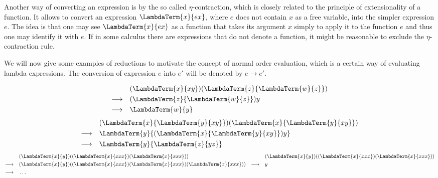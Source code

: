 Another way of converting an expression is by the so called $\eta$-contraction,
which is closely related to the principle of extensionality of a function. It
allows to convert an expression $\LambdaTerm{x}{ex}$, where $e$ does not contain
$x$ as a free variable, into the simpler expression $e$. The idea is that one
may see $\LambdaTerm{x}{ex}$ as a function that takes its argument $x$ simply to
apply it to the function $e$ and thus one may identify it with $e$. If in some
calculus there are expressions that do not denote a function, it might be
reasonable to exclude the $\eta$-contraction rule.

We will now give some examples of reductions to motivate the concept of normal
order evaluation, which is a certain way of evaluating lambda
expressions. The conversion of expression $e$ into $e'$ will be denoted by $e \longrightarrow
e'$. 
\begin{expl}
\begin{align}
  & (\LambdaTerm{x}{xy})(\LambdaTerm{z}{\LambdaTerm{w}{z}}) \\
\longrightarrow \quad& (\LambdaTerm{z}{\LambdaTerm{w}{z}})y \notag \\
\longrightarrow \quad& \LambdaTerm{w}{y} \notag
\end{align}
\begin{align}
& (\LambdaTerm{x}{\LambdaTerm{y}{xy}})(\LambdaTerm{x}{\LambdaTerm{y}{xy}})\\
\longrightarrow \quad& \LambdaTerm{y}{(\LambdaTerm{x}{\LambdaTerm{y}{xy}})y} \notag\\
\longrightarrow \quad& \LambdaTerm{y}{\LambdaTerm{z}{yz}} \notag
\end{align}
\begin{align}
\label{eq:lambda-diverge}
  &  (\LambdaTerm{x}{y})((\LambdaTerm{x}{xxx}) (\LambdaTerm{x}{xxx})) & 
  & (\LambdaTerm{x}{y})((\LambdaTerm{x}{xxx}) (\LambdaTerm{x}{xxx}))\\
\longrightarrow \quad& (\LambdaTerm{x}{y})
      ((\LambdaTerm{x}{xxx})(\LambdaTerm{x}{xxx})(\LambdaTerm{x}{xxx})) \notag&
 \longrightarrow \quad& y \\
\longrightarrow \quad& \ldots \notag
\end{align}
\end{expl}

